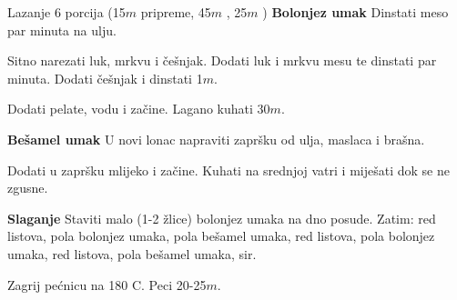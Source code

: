 \documentclass[a4paper]{article}
\begin{document}
\begin{recipe}{Lazanje}%
  {6 porcija}%
  { (15$m$ pripreme, 45$m$ \fryingpan, 25$m$ \oven )}
\ingredient[]{}{\fryingpan}
  {\bf Bolonjez umak}\newline
  Dinstati meso par minuta na ulju.

  Sitno narezati luk, mrkvu i češnjak. Dodati luk i mrkvu mesu te dinstati par
  minuta. Dodati češnjak i dinstati 1$m$.

  Dodati pelate, vodu i začine. Lagano kuhati 30$m$.

\ingredient[]{}{\pot}
  {\bf Bešamel umak}\newline
  U novi lonac napraviti zapršku od ulja, maslaca i brašna.

  Dodati u zapršku mlijeko i začine. Kuhati na srednjoj vatri i miješati dok se
  ne zgusne.

\ingredient[]{}{\pan}
  {\bf Slaganje}\newline
  Staviti malo (1-2 žlice) bolonjez umaka na dno posude. Zatim:
    red listova,
    pola bolonjez umaka,
    pola bešamel umaka,
    red listova,
    pola bolonjez umaka,
    red listova,
    pola bešamel umaka,
    sir.

\ingredient[]{}{\oven}
  Zagrij pećnicu na 180\0 C. Peci 20-25$m$.

\end{recipe}
\end{document}
